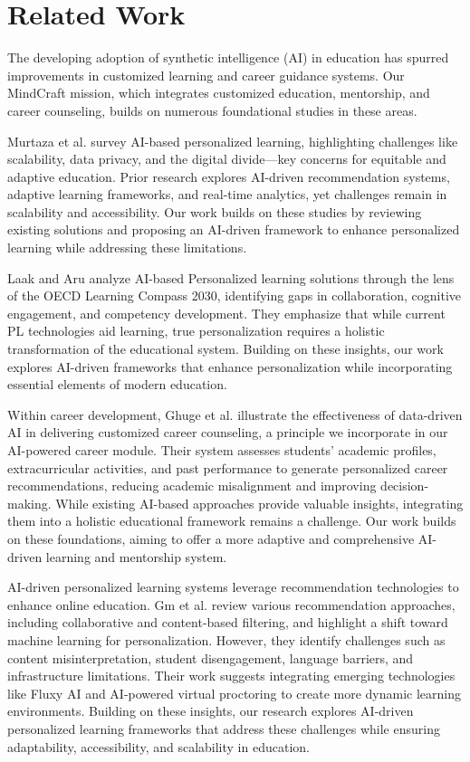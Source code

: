 \section{Related Work}
The developing adoption of synthetic intelligence (AI) in education has spurred improvements in customized learning and career guidance systems. Our MindCraft mission, which integrates customized education, mentorship, and career counseling, builds on numerous foundational studies in these areas.


Murtaza et al. \cite{ref1} survey AI-based personalized learning, highlighting challenges like scalability, data privacy, and the digital divide—key concerns for equitable and adaptive education. Prior research explores AI-driven recommendation systems, adaptive learning frameworks, and real-time analytics, yet challenges remain in scalability and accessibility. Our work builds on these studies by reviewing existing solutions and proposing an AI-driven framework to enhance personalized learning while addressing these limitations.


Laak and Aru \cite{ref2} analyze AI-based Personalized learning solutions through the lens of the OECD Learning Compass 2030, identifying gaps in collaboration, cognitive engagement, and competency development. They emphasize that while current PL technologies aid learning, true personalization requires a holistic transformation of the educational system. Building on these insights, our work explores AI-driven frameworks that enhance personalization while incorporating essential elements of modern education.

Within career development, Ghuge et al. \cite{ref3} illustrate the effectiveness of data-driven AI in delivering customized career counseling, a principle we incorporate in our AI-powered career module. Their system assesses students' academic profiles, extracurricular activities, and past performance to generate personalized career recommendations, reducing academic misalignment and improving decision-making. While existing AI-based approaches provide valuable insights, integrating them into a holistic educational framework remains a challenge. Our work builds on these foundations, aiming to offer a more adaptive and comprehensive AI-driven learning and mentorship system.

AI-driven personalized learning systems leverage recommendation technologies to enhance online education. Gm et al. \cite{ref4} review various recommendation approaches, including collaborative and content-based filtering, and highlight a shift toward machine learning for personalization. However, they identify challenges such as content misinterpretation, student disengagement, language barriers, and infrastructure limitations. Their work suggests integrating emerging technologies like Fluxy AI and AI-powered virtual proctoring to create more dynamic learning environments. Building on these insights, our research explores AI-driven personalized learning frameworks that address these challenges while ensuring adaptability, accessibility, and scalability in education.


